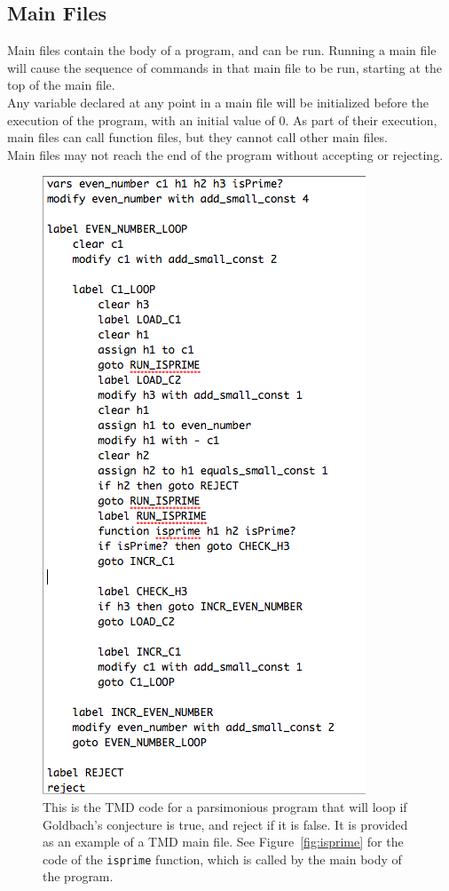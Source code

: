 \documentclass{report}
\begin{document}
\subsection{Main Files}

Main files contain the body of a program, and can be run. Running a main file will cause the sequence of commands in that main file to be run, starting at the top of the main file. \\

Any variable declared at any point in a main file will be initialized before the execution of the program, with an initial value of 0. As part of their execution, main files can call function files, but they cannot call other main files. \\

Main files may not reach the end of the program without accepting or rejecting. 

\begin{figure} 
\begin{center} 
\includegraphics[scale=0.75]{figs/goldbach.png} 
\caption{This is the TMD code for a parsimonious program that will loop if Goldbach's conjecture is true, and reject if it is false. It is provided as an example of a TMD main file. See Figure~\ref{fig:isprime} for the code of the \texttt{isprime} function, which is called by the main body of the program.\label{fig:goldbach}} 
\end{center} 
\end{figure}
\end{document}
